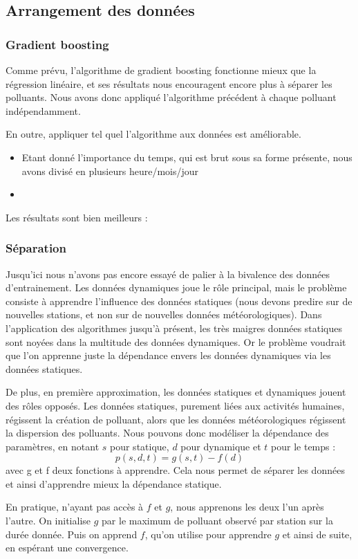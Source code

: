 \subsection{Arrangement des données}

\subsubsection{Gradient boosting}

Comme prévu, l'algorithme de gradient boosting fonctionne mieux que la régression linéaire, et ses résultats nous encouragent encore plus à séparer les polluants. Nous avons donc appliqué l'algorithme précédent à chaque polluant indépendamment. 

En outre, appliquer tel quel l'algorithme aux données est améliorable.
\begin{itemize}
	\item Etant donné l'importance du temps, qui est brut sous sa forme présente, nous avons divisé en plusieurs heure/mois/jour %
	\item 
\end{itemize}  

Les résultats sont bien meilleurs : 



\subsubsection{Séparation}

Jusqu'ici nous n'avons pas encore essayé de palier à la bivalence des données d'entrainement. Les données dynamiques joue le rôle principal, mais le problème consiste à apprendre l'influence des données statiques (nous devons predire sur de nouvelles stations, et non sur de nouvelles données météorologiques). Dans l'application des algorithmes jusqu'à présent, les très maigres données statiques sont noyées dans la multitude des données dynamiques. Or le problème voudrait que l'on apprenne juste la dépendance envers les données dynamiques via les données statiques.

De plus, en première approximation, les données statiques et dynamiques jouent des rôles opposés. Les données statiques, purement liées aux activités humaines, régissent la création de polluant, alors que les données météorologiques régissent la dispersion des polluants. Nous pouvons donc modéliser la dépendance des paramètres, en notant $s$ pour statique, $d$ pour dynamique et $t$ pour le temps : $$ p(s,d,t) = g(s,t) - f(d)$$ avec g et f deux fonctions à apprendre. Cela nous permet de séparer les données et ainsi d'apprendre mieux la dépendance statique.

En pratique, n'ayant pas accès à $f$ et $g$, nous apprenons les deux l'un après l'autre. On initialise $g$ par le maximum de polluant observé par station sur la durée donnée. Puis on apprend $f$, qu'on utilise pour apprendre $g$ et ainsi de suite, en espérant une convergence. 
